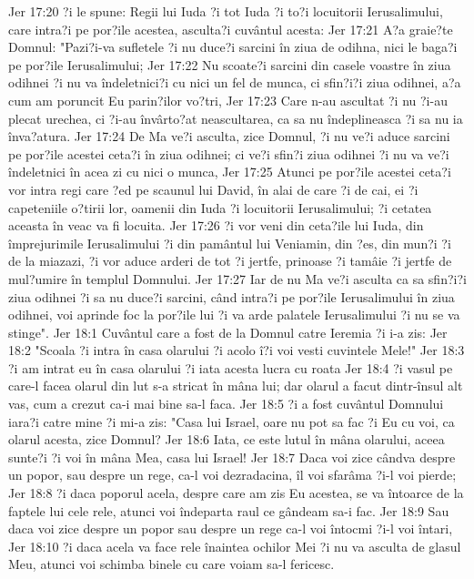 Jer 17:20  ?i le spune: Regii lui Iuda ?i tot Iuda ?i to?i locuitorii Ierusalimului, care intra?i pe por?ile acestea, asculta?i cuvântul acesta:
Jer 17:21  A?a graie?te Domnul: "Pazi?i-va sufletele ?i nu duce?i sarcini în ziua de odihna, nici le baga?i pe por?ile Ierusalimului;
Jer 17:22  Nu scoate?i sarcini din casele voastre în ziua odihnei ?i nu va îndeletnici?i cu nici un fel de munca, ci sfin?i?i ziua odihnei, a?a cum am poruncit Eu parin?ilor vo?tri,
Jer 17:23  Care n-au ascultat ?i nu ?i-au plecat urechea, ci ?i-au învârto?at neascultarea, ca sa nu îndeplineasca ?i sa nu ia înva?atura.
Jer 17:24  De Ma ve?i asculta, zice Domnul, ?i nu ve?i aduce sarcini pe por?ile acestei ceta?i în ziua odihnei; ci ve?i sfin?i ziua odihnei ?i nu va ve?i îndeletnici în acea zi cu nici o munca,
Jer 17:25  Atunci pe por?ile acestei ceta?i vor intra regi care ?ed pe scaunul lui David, în alai de care ?i de cai, ei ?i capeteniile o?tirii lor, oamenii din Iuda ?i locuitorii Ierusalimului; ?i cetatea aceasta în veac va fi locuita.
Jer 17:26  ?i vor veni din ceta?ile lui Iuda, din împrejurimile Ierusalimului ?i din pamântul lui Veniamin, din ?es, din mun?i ?i de la miazazi, ?i vor aduce arderi de tot ?i jertfe, prinoase ?i tamâie ?i jertfe de mul?umire în templul Domnului.
Jer 17:27  Iar de nu Ma ve?i asculta ca sa sfin?i?i ziua odihnei ?i sa nu duce?i sarcini, când intra?i pe por?ile Ierusalimului în ziua odihnei, voi aprinde foc la por?ile lui ?i va arde palatele Ierusalimului ?i nu se va stinge".
Jer 18:1  Cuvântul care a fost de la Domnul catre Ieremia ?i i-a zis:
Jer 18:2  "Scoala ?i intra în casa olarului ?i acolo î?i voi vesti cuvintele Mele!"
Jer 18:3  ?i am intrat eu în casa olarului ?i iata acesta lucra cu roata
Jer 18:4  ?i vasul pe care-l facea olarul din lut s-a stricat în mâna lui; dar olarul a facut dintr-însul alt vas, cum a crezut ca-i mai bine sa-l faca.
Jer 18:5  ?i a fost cuvântul Domnului iara?i catre mine ?i mi-a zis: "Casa lui Israel, oare nu pot sa fac ?i Eu cu voi, ca olarul acesta, zice Domnul?
Jer 18:6  Iata, ce este lutul în mâna olarului, aceea sunte?i ?i voi în mâna Mea, casa lui Israel!
Jer 18:7  Daca voi zice cândva despre un popor, sau despre un rege, ca-l voi dezradacina, îl voi sfarâma ?i-l voi pierde;
Jer 18:8  ?i daca poporul acela, despre care am zis Eu acestea, se va întoarce de la faptele lui cele rele, atunci voi îndeparta raul ce gândeam sa-i fac.
Jer 18:9  Sau daca voi zice despre un popor sau despre un rege ca-l voi întocmi ?i-l voi întari,
Jer 18:10  ?i daca acela va face rele înaintea ochilor Mei ?i nu va asculta de glasul Meu, atunci voi schimba binele cu care voiam sa-l fericesc.
